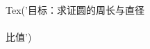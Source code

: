 \documentclass[preview]{standalone}
\begin{document}
\begin{center}
Tex('目标：求证圆的周长与直径\\\\比值')
\end{center}
\end{document}
